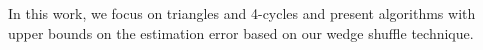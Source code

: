 In this work, we focus on triangles and 4-cycles and 
present algorithms with upper bounds on the estimation error based on our wedge shuffle technique. 



